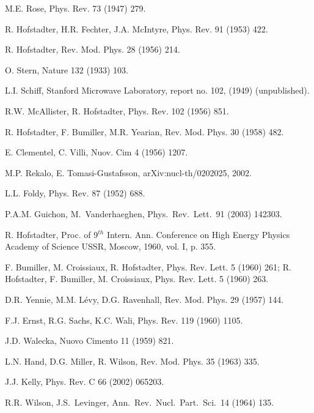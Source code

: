 \begin{thebibliography}{PPV06}
M.E. Rose, Phys. Rev. 73 (1947) 279.

R. Hofstadter, H.R. Fechter, J.A. McIntyre,
Phys. Rev.  91 (1953) 422.

R. Hofstadter, Rev. Mod. Phys. 28 (1956) 214.

O. Stern, Nature  132 (1933) 103.

L.I. Schiff, Stanford Microwave Laboratory, report no. 102, (1949) (unpublished).

R.W. McAllister, R. Hofstadter, Phys. Rev. 102 (1956) 851.

R. Hofstadter, F. Bumiller, M.R. Yearian, 
Rev. Mod. Phys.  30 (1958) 482. 

E. Clementel, C. Villi, Nuov. Cim  4 (1956) 1207.

M.P. Rekalo, E. Tomasi-Gustafsson, arXiv:nucl-th/0202025, 2002.

L.L. Foldy, Phys. Rev.  87 (1952) 688.

  P.A.M. Guichon, M.~Vanderhaeghen,
  Phys.\ Rev.\ Lett.\   91 (2003) 142303.

R. Hofstadter, Proc. of 9$^{th}$ Intern. Ann. 
Conference on High Energy Physics Academy of Science USSR, Moscow, 1960, 
vol. I, p. 355.

F. Bumiller, M. Croissiaux, R. Hofstadter, 
Phys. Rev. Lett.  5 (1960) 261;  
R. Hofstadter, F. Bumiller, M. Croissiaux,  
Phys. Rev. Lett.  5 (1960) 263.

D.R. Yennie, M.M. L\'evy, D.G. Ravenhall, Rev. Mod. Phys.  29 (1957) 144.

F.J. Ernst, R.G. Sachs, K.C. Wali, Phys. Rev. 119 (1960) 1105. 

J.D. Walecka, Nuovo Cimento  11 (1959) 821.

L.N. Hand, D.G. Miller, R. Wilson, Rev. Mod. Phys. 35 (1963) 335. 


J.J. Kelly,  Phys. Rev. C 66 (2002) 065203.

  R.R. Wilson, J.S.~Levinger,
  Ann.\ Rev.\ Nucl.\ Part.\ Sci.\  14 (1964) 135.


\end{thebibliography}
